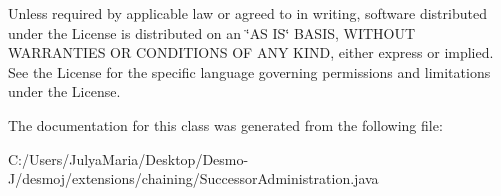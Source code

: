 Unless required by applicable law or agreed to in writing, software distributed under the License is distributed on an \char`\"{}\-A\-S I\-S\char`\"{} B\-A\-S\-I\-S, W\-I\-T\-H\-O\-U\-T W\-A\-R\-R\-A\-N\-T\-I\-E\-S O\-R C\-O\-N\-D\-I\-T\-I\-O\-N\-S O\-F A\-N\-Y K\-I\-N\-D, either express or implied. See the License for the specific language governing permissions and limitations under the License. 

The documentation for this class was generated from the following file\-:\begin{DoxyCompactItemize}
\item 
C\-:/\-Users/\-Julya\-Maria/\-Desktop/\-Desmo-\/\-J/desmoj/extensions/chaining/Successor\-Administration.\-java\end{DoxyCompactItemize}
